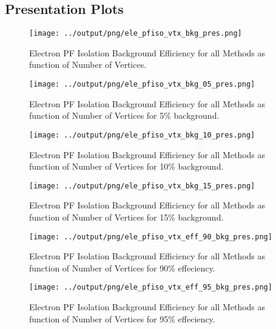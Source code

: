 \documentclass[11pt]{book}
\begin{document}
\subsection{Presentation Plots}
\begin{figure}[htb]
\centering
\texttt{[image: ../output/png/ele\_pfiso\_vtx\_bkg\_pres.png]}
\caption{Electron PF Isolation Background Efficiency for all Methods as function of Number of Vertices.}
\label{fig:ele_pfiso_vtx_bkg_pres}
\end{figure}

\begin{figure}[htb]
\centering
\texttt{[image: ../output/png/ele\_pfiso\_vtx\_bkg\_05\_pres.png]}
\caption{Electron PF Isolation Background Efficiency for all Methods as function of Number of Vertices for 5\% background.}
\label{fig:ele_pfiso_vtx_bkg_05_pres}
\end{figure}

\begin{figure}[htb]
\centering
\texttt{[image: ../output/png/ele\_pfiso\_vtx\_bkg\_10\_pres.png]}
\caption{Electron PF Isolation Background Efficiency for all Methods as function of Number of Vertices for 10\% background.}
\label{fig:ele_pfiso_vtx_bkg_10_pres}
\end{figure}

\begin{figure}[htb]
\centering
\texttt{[image: ../output/png/ele\_pfiso\_vtx\_bkg\_15\_pres.png]}
\caption{Electron PF Isolation Background Efficiency for all Methods as function of Number of Vertices for 15\% background.}
\label{fig:ele_pfiso_vtx_bkg_15_pres}
\end{figure}

\begin{figure}[htb]
\centering
\texttt{[image: ../output/png/ele\_pfiso\_vtx\_eff\_90\_bkg\_pres.png]}
\caption{Electron PF Isolation Background Efficiency for all Methods as function of Number of Vertices for 90\% effeciency.}
\label{fig:ele_pfiso_vtx_eff_90_bkg_pres}
\end{figure}

\begin{figure}[htb]
\centering
\texttt{[image: ../output/png/ele\_pfiso\_vtx\_eff\_95\_bkg\_pres.png]}
\caption{Electron PF Isolation Background Efficiency for all Methods as function of Number of Vertices for 95\% effeciency.}
\label{fig:ele_pfiso_vtx_eff_95_bkg_pres}
\end{figure}
\end{document}
